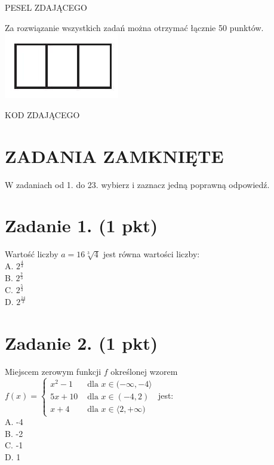 \documentclass[10pt]{article}
\begin{document}
PESEL ZDAJĄCEGO

Za rozwiązanie wszystkich zadań można otrzymać łącznie 50 punktów.\\
\includegraphics[max width=\textwidth, center]{2024_11_21_a38d702bc7be8115942cg-01}

KOD ZDAJĄCEGO

\section*{ZADANIA ZAMKNIĘTE}
W zadaniach od 1. do 23. wybierz i zaznacz jedną poprawną odpowiedź.

\section*{Zadanie 1. (1 pkt)}
Wartość liczby \(a=16 \sqrt[3]{4}\) jest równa wartości liczby:\\
A. \(2^{\frac{4}{3}}\)\\
B. \(2^{\frac{7}{3}}\)\\
C. \(2^{\frac{5}{3}}\)\\
D. \(2^{\frac{14}{3}}\)

\section*{Zadanie 2. (1 pkt)}
Miejscem zerowym funkcji \(f\) określonej wzorem \(f(x)=\left\{\begin{array}{ll}x^{2}-1 & \text { dla } x \in(-\infty,-4\rangle \\ 5 x+10 & \text { dla } x \in(-4,2) \\ x+4 & \text { dla } x \in\langle 2,+\infty)\end{array}\right.\) jest:\\
A. -4\\
B. -2\\
C. -1\\
D. 1
\end{document}
